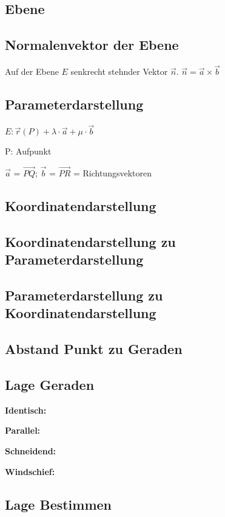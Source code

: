 \begin{multicols*}{3}
\section{Ebene}
\subsection{Normalenvektor der Ebene}
{Auf der Ebene $ E $ senkrecht stehnder Vektor $\vec{n}$.}
$\vec{n} = \vec{a} \times \vec{b}$

\subsection{Parameterdarstellung}

{\large $ E: \vec{r}(P) + \lambda \cdot \vec{a} + \mu \cdot \vec{b} $}

{P: Aufpunkt}

{$ \vec{a}$ = $\overrightarrow{PQ} $; $ \vec{b}$ = $\overrightarrow{PR} $ = Richtungsvektoren}



\subsection{Koordinatendarstellung}

\subsection{Koordinatendarstellung zu Parameterdarstellung }

\subsection{Parameterdarstellung zu Koordinatendarstellung}

\subsection{Abstand Punkt zu Geraden}

\subsection{Lage Geraden}

\textbf{Identisch:}  

\textbf{Parallel:} 

\textbf{Schneidend:}

\textbf{Windschief:} 

\subsection{Lage Bestimmen}


\end{multicols*}
